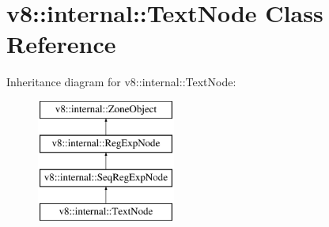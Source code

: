 \hypertarget{classv8_1_1internal_1_1TextNode}{}\section{v8\+:\+:internal\+:\+:Text\+Node Class Reference}
\label{classv8_1_1internal_1_1TextNode}
Inheritance diagram for v8\+:\+:internal\+:\+:Text\+Node\+:\begin{figure}[H]
\begin{center}
\leavevmode
\includegraphics[height=4.000000cm]{classv8_1_1internal_1_1TextNode}
\end{center}
\end{figure}
